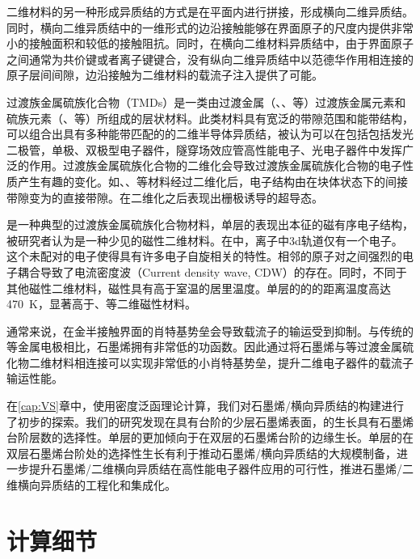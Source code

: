 二维材料的另一种形成异质结的方式是在平面内进行拼接，形成横向二维异质结。同时，横向二维异质结中的一维形式的边沿接触能够在界面原子的尺度内提供非常小的接触面积和较低的接触阻抗。同时，在横向二维材料异质结中，由于界面原子之间通常为共价键或者离子键键合，没有纵向二维异质结中以范德华作用相连接的原子层间间隙，边沿接触为二维材料的载流子注入提供了可能。

过渡族金属硫族化合物（TMDs）是一类由过渡金属（、、等）过渡族金属元素和硫族元素（、等）所组成的层状材料。此类材料具有宽泛的带隙范围和能带结构，可以组合出具有多种能带匹配的的二维半导体异质结，被认为可以在包括包括发光二极管，单极、双极型电子器件，隧穿场效应管高性能电子、光电子器件中发挥广泛的作用。过渡族金属硫族化合物的二维化会导致过渡族金属硫族化合物的电子性质产生有趣的变化。如、、等材料经过二维化后，电子结构由在块体状态下的间接带隙变为的直接带隙。在二维化之后表现出栅极诱导的超导态。

是一种典型的过渡族金属硫族化合物材料，单层的表现出本征的磁有序电子结构，被研究者认为是一种少见的磁性二维材料。在中，离子中3d轨道仅有一个电子。这个未配对的电子使得具有许多电子自旋相关的特性。相邻的原子对之间强烈的电子耦合导致了电流密度波（Current density wave, CDW）的存在。同时，不同于其他磁性二维材料，磁性具有高于室温的居里温度。单层的的的距离温度高达\SI{470}{\kelvin}，显著高于、等二维磁性材料。

通常来说，在金半接触界面的肖特基势垒会导致载流子的输运受到抑制。与传统的等金属电极相比，石墨烯拥有非常低的功函数。因此通过将石墨烯与等过渡金属硫化物二维材料相连接可以实现非常低的小肖特基势垒，提升二维电子器件的载流子输运性能。

在\ref{cap:VS}章中，使用密度泛函理论计算，我们对石墨烯/横向异质结的构建进行了初步的探索。我们的研究发现在具有台阶的少层石墨烯表面，的生长具有石墨烯台阶层数的选择性。单层的更加倾向于在双层的石墨烯台阶的边缘生长。单层的在双层石墨烯台阶处的选择性生长有利于推动石墨烯/横向异质结的大规模制备，进一步提升石墨烯/二维横向异质结在高性能电子器件应用的可行性，推进石墨烯/二维横向异质结的工程化和集成化。

\section{计算细节}

